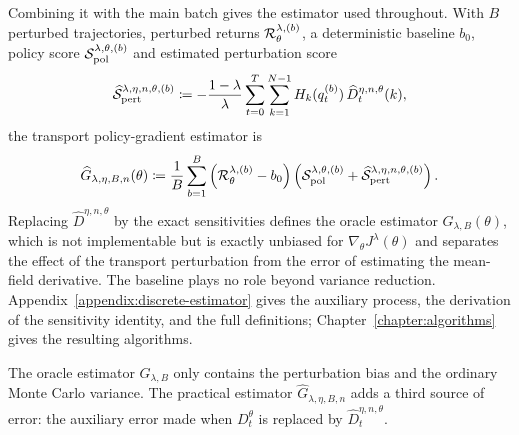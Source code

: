 Combining it with the main batch gives the estimator used throughout. With $B$ perturbed trajectories, perturbed returns ${\cal R}_\theta^{\lambda,(b)}$, a deterministic baseline $b_0$, policy score ${\cal S}_{\mathrm{pol}}^{\lambda,\theta,(b)}$ and estimated perturbation score
\begin{align}
    \widehat{{\cal S}}_{\mathrm{pert}}^{\lambda,\eta,n,\theta,(b)}
    \coloneqq
    -\frac{1-\lambda}{\lambda}\sum_{t=0}^T\sum_{k=1}^{N-1}H_k(q_t^{(b)})\,\widehat D_t^{\eta,n,\theta}(k),
\end{align}
the transport policy-gradient estimator is
\begin{align}
    \widehat G_{\lambda,\eta,B,n}(\theta)
    \coloneqq
    \frac1B\sum_{b=1}^B\left({\cal R}_\theta^{\lambda,(b)}-b_0\right)
    \left({\cal S}_{\mathrm{pol}}^{\lambda,\theta,(b)}+\widehat{{\cal S}}_{\mathrm{pert}}^{\lambda,\eta,n,\theta,(b)}\right).
    \label{eq:discrete-transport-estimator}
\end{align}
Replacing $\widehat D^{\eta,n,\theta}$ by the exact sensitivities defines the oracle estimator $G_{\lambda,B}(\theta)$, which is not implementable but is exactly unbiased for $\nabla_\theta J^\lambda(\theta)$ and separates the effect of the transport perturbation from the error of estimating the mean-field derivative. The baseline plays no role beyond variance reduction. Appendix~\ref{appendix:discrete-estimator} gives the auxiliary process, the derivation of the sensitivity identity, and the full definitions; Chapter~\ref{chapter:algorithms} gives the resulting algorithms.

The oracle estimator $G_{\lambda,B}$ only contains the perturbation bias and the ordinary Monte Carlo variance. The practical estimator $\widehat G_{\lambda,\eta,B,n}$ adds a third source of error: the auxiliary error made when $D_t^\theta$ is replaced by $\widehat D_t^{\eta,n,\theta}$.

